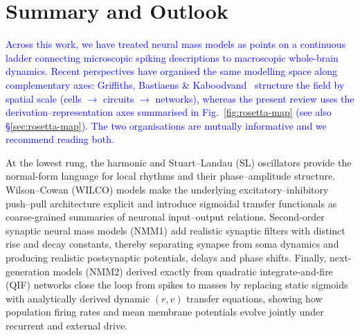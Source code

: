 \documentclass[12pt]{article}
\numberwithin{equation}{section}
\newcommand{\rev}[1]{\textcolor{blue}{#1}}
\begin{document}




\clearpage \section{Summary and Outlook}


\label{sec:Closing}


\rev{Across this work, we have treated neural mass models as points on a continuous ladder connecting microscopic spiking descriptions to macroscopic whole-brain dynamics. Recent perspectives have organised the same modelling space along complementary axes: Griffiths, Bastiaens \& Kaboodvand~\cite{griffiths_bastiaens_kaboodvand_2021} structure the field by spatial scale (cells $\to$ circuits $\to$ networks), whereas the present review uses the derivation--representation axes summarised in Fig.~\ref{fig:rosetta-map} (see also \S\ref{sec:rosetta-map}). The two organisations are mutually informative and we recommend reading both.} 

At the lowest rung, the harmonic and Stuart–Landau (SL) oscillators provide the normal-form language for local rhythms and their phase–amplitude structure. Wilson–Cowan (WILCO) models make the underlying excitatory–inhibitory push–pull architecture explicit and introduce sigmoidal transfer functionals as coarse-grained summaries of neuronal input–output relations. Second-order synaptic neural mass models (NMM1) add realistic synaptic filters with distinct rise and decay constants, thereby separating synapse from soma dynamics and producing realistic postsynaptic potentials, delays and phase shifts. Finally, next-generation models (NMM2) derived exactly from quadratic integrate-and-fire (QIF) networks close the loop from spikes to masses by replacing static sigmoids with analytically derived dynamic $(r,v)$ transfer equations, showing how population firing rates and mean membrane potentials evolve jointly under recurrent and external drive.\cite{montbrioMacroscopicDescriptionNetworks2015,coombesNextGenerationNeural2019,byrneNextgenerationNeuralMass2020,clusellaComparisonExactHeuristic2023}
\end{document}
